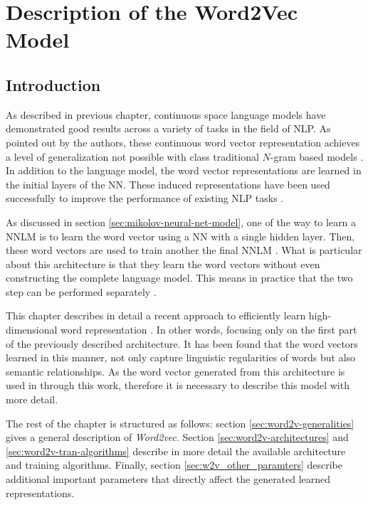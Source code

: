 \chapter{Description of the Word2Vec Model }
\label{chap:word2vec_description}


\section{Introduction}
As described in  previous chapter,  continuous space language  models have
demonstrated good results across a variety of tasks in the field of NLP.  As pointed out by
the authors, these continuous word vector representation achieves a level of
generalization not possible with class traditional $N$-gram based models
\cite{conf/icassp/MikolovKBGC09}. In addition to the language model, the word vector
representations are learned in the initial layers of the \ac{NN}. These
induced representations  have been used successfully to improve the
performance of existing \ac{NLP} tasks \cite{collobert:2008}
\cite{Turian:2010:WRS:1858681.1858721}. 

As discussed in section \ref{sec:mikolov-neural-net-model},  one of the way to learn a
\ac{NNLM} is to learn the word vector using  a \ac{NN} with a single hidden
layer. Then, these word vectors are used to  train another the final
\ac{NNLM} \cite{conf/icassp/MikolovKBGC09}.   
What is particular about this architecture is that they learn the  word
vectors without  even constructing the complete language model.  This means
in practice that the two step can be performed separately \cite{conf/icassp/MikolovKBGC09}. 

This chapter describes in detail a recent approach to efficiently learn
high-dimensional word representation \cite{DBLP:journals/corr/abs-1301-3781}.
In other words, focusing only on the first part of the previously described 
architecture. It has been found that the word vectors learned in this manner,
not only capture linguistic regularities of words  but also semantic
relationships. As the word vector generated from this architecture is used in
through this work, therefore it is necessary to describe this model with more
detail.

The rest of the chapter is structured as follows: section
\ref{sec:word2v-generalities} gives a general description of
\textit{Word2vec}.  Section \ref{sec:word2v-architectures} and
\ref{sec:word2v-tran-algorithms} describe in more detail the available
architecture and training algorithms. Finally, section
\ref{sec:w2v_other_paramters} describe additional important parameters that
directly affect the generated learned representations.

